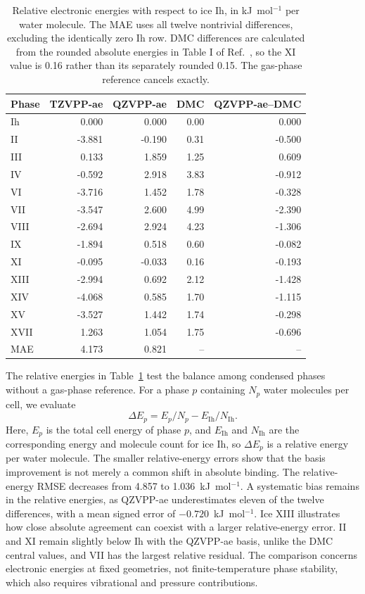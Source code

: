 \documentclass[10pt,a4paper]{article}
\begin{document}
\begin{table}[htbp]
\centering\small
\caption{Relative electronic energies with respect to ice Ih, in kJ~mol$^{-1}$ per water molecule. The MAE uses all twelve nontrivial differences, excluding the identically zero Ih row. DMC differences are calculated from the rounded absolute energies in Table I of Ref.~, so the XI value is 0.16 rather than its separately rounded 0.15. The gas-phase reference cancels exactly.}
\label{tab:ice-relative}
\begin{tabular}{lrrrr}
\toprule
Phase & TZVPP-ae & QZVPP-ae & DMC & QZVPP-ae--DMC\\
\midrule
Ih & 0.000 & 0.000 & 0.00 & 0.000\\
II & -3.881 & -0.190 & 0.31 & -0.500\\
III & 0.133 & 1.859 & 1.25 & 0.609\\
IV & -0.592 & 2.918 & 3.83 & -0.912\\
VI & -3.716 & 1.452 & 1.78 & -0.328\\
VII & -3.547 & 2.600 & 4.99 & -2.390\\
VIII & -2.694 & 2.924 & 4.23 & -1.306\\
IX & -1.894 & 0.518 & 0.60 & -0.082\\
XI & -0.095 & -0.033 & 0.16 & -0.193\\
XIII & -2.994 & 0.692 & 2.12 & -1.428\\
XIV & -4.068 & 0.585 & 1.70 & -1.115\\
XV & -3.527 & 1.442 & 1.74 & -0.298\\
XVII & 1.263 & 1.054 & 1.75 & -0.696\\
\midrule
MAE & 4.173 & 0.821 & -- & --\\
\bottomrule
\end{tabular}
\end{table}


The relative energies in Table~\ref{tab:ice-relative} test the balance among condensed phases without a gas-phase reference. For a phase $p$ containing $N_p$ water molecules per cell, we evaluate
\begin{equation}
 \Delta E_p = E_p/N_p-E_{\mathrm{Ih}}/N_{\mathrm{Ih}}.
\end{equation}
Here, $E_p$ is the total cell energy of phase $p$, and $E_{\mathrm{Ih}}$ and $N_{\mathrm{Ih}}$ are the corresponding energy and molecule count for ice Ih, so $\Delta E_p$ is a relative energy per water molecule.
The smaller relative-energy errors show that the basis improvement is not merely a common shift in absolute binding. The relative-energy RMSE decreases from 4.857 to 1.036~kJ~mol$^{-1}$.  A systematic bias remains in the relative energies, as QZVPP-ae underestimates eleven of the twelve differences, with a mean signed error of $-0.720$~kJ~mol$^{-1}$. Ice XIII illustrates how close absolute agreement can coexist with a larger relative-energy error. II and XI remain slightly below Ih with the QZVPP-ae basis, unlike the DMC central values, and VII has the largest relative residual.  The comparison concerns electronic energies at fixed geometries, not finite-temperature phase stability, which also requires vibrational and pressure contributions.
\end{document}
